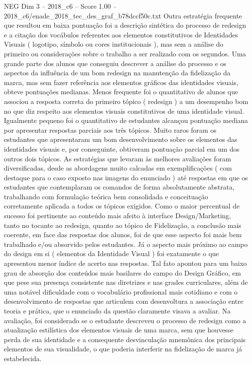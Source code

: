 \begin{textsample}{NEG Dim 3 – 2018\_c6 – Score 1.00 – 2018\_c6/enade\_2018\_tec\_des\_graf\_b78dccf50c.txt}
Outra estratégia frequente que resultou em baixa pontuação foi a descrição sintética do processo de redesign e a citação dos vocábulos referentes aos elementos constitutivos de Identidades Visuais ( logotipo, símbolo ou cores institucionais ), mas sem a análise do primeiro ou considerações sobre o trabalho a ser realizado com os segundos.
Uma grande parte dos alunos que conseguiu descrever a análise do processo e os aspectos da influência de um bom redesign na manutenção da fidelização da marca, mas sem fazer referência aos elementos gráficos das identidades visuais, obteve pontuações medianas.
Menos frequente foi o quantitativo de alunos que associou a resposta correta do primeiro tópico ( redesign ) a um desempenho bom no que diz respeito aos elementos visuais constitutivos de uma identidade visual.
Igualmente pequeno foi o quantitativo de estudantes alcançou pontuação mediana por apresentar respostas parciais aos três tópicos.
Muito raros foram os estudantes que apresentaram um bom desenvolvimento sobre os elementos das identidades visuais e, por conseguinte, obtiveram pontuação parcial em um dos outros dois tópicos.
As estratégias que levaram às melhores avaliações foram diversificadas, desde as abordagens muito calcadas em exemplificações ( com destaque para o caso exposto nas imagens do enunciado ) até respostas em que os estudantes que contemplaram os comandos de forma absolutamente abstrata, trabalhando com formulação teórica bem consolidada e conceituação corretamente aplicada a todos os tópicos exigidos.
Como o maior percentual de sucesso foi pertinente ao conteúdo mais afeito à interface Design/Marketing, tanto no tocante ao redesign, quanto ao tópico de Fidelização, a conclusão mais coerente, em face das respostas dos alunos, foi de que esse aspecto foi mais bem trabalhado e/ou absorvido pelos estudantes.
Já o aspecto mais próximo ao campo do design em si ( elementos da Identidade Visual ) foi exatamente o que apresentou menor índice de acerto nas respostas.
Tal fato apontou para um baixo grau de absorção dos conteúdos mais basilares do campo do Design Gráfico, em que pese sua presença consistente nas diretrizes e nas grades curriculares, além de uma notável dificuldade com o vocabulário profissional mais cotidiano e com o desenvolvimento de respostas que articulem com desenvoltura a associação entre teoria e prática, que o enunciado da questão claramente visava a avaliar.
Na avaliação, foi considerado se o estudante descreveu o processo de redesign como a atualização estilística dos elementos visuais de uma marca, sem que houvesse perda de sua identidade e a consequente desvinculação mnemônica dos principais elementos de sua visualidade, o que poderia interferir na fidelização de marca já estabelecida.

\end{textsample}
